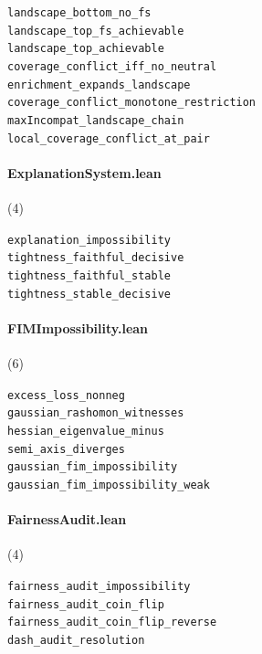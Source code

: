 {\footnotesize
\texttt{landscape\_bottom\_no\_fs}\\
\texttt{landscape\_top\_fs\_achievable}\\
\texttt{landscape\_top\_achievable}\\
\texttt{coverage\_conflict\_iff\_no\_neutral}\\
\texttt{enrichment\_expands\_landscape}\\
\texttt{coverage\_conflict\_monotone\_restriction}\\
\texttt{maxIncompat\_landscape\_chain}\\
\texttt{local\_coverage\_conflict\_at\_pair}\\
}

\paragraph{ExplanationSystem.lean} (4)

{\footnotesize
\texttt{explanation\_impossibility}\\
\texttt{tightness\_faithful\_decisive}\\
\texttt{tightness\_faithful\_stable}\\
\texttt{tightness\_stable\_decisive}\\
}

\paragraph{FIMImpossibility.lean} (6)

{\footnotesize
\texttt{excess\_loss\_nonneg}\\
\texttt{gaussian\_rashomon\_witnesses}\\
\texttt{hessian\_eigenvalue\_minus}\\
\texttt{semi\_axis\_diverges}\\
\texttt{gaussian\_fim\_impossibility}\\
\texttt{gaussian\_fim\_impossibility\_weak}\\
}

\paragraph{FairnessAudit.lean} (4)

{\footnotesize
\texttt{fairness\_audit\_impossibility}\\
\texttt{fairness\_audit\_coin\_flip}\\
\texttt{fairness\_audit\_coin\_flip\_reverse}\\
\texttt{dash\_audit\_resolution}\\
}

